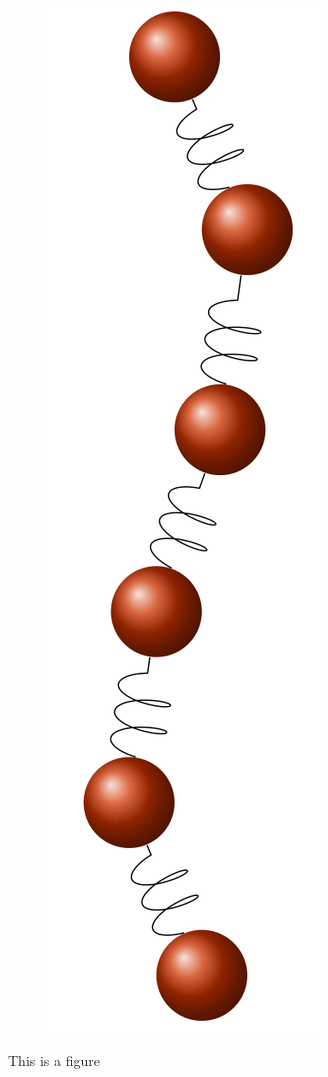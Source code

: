 \begin{figure}[ht]
\begin{centering}
\begin{subfigure}[t]{\dimexpr.3\linewidth-1.3em\relax}
  \includegraphics[width=.5\linewidth,valign=t]{Figures/beadSpring.png}
  \end{subfigure}
  \caption{This is a figure}
  \label{fig:test}
  \end{centering}
\end{figure}
